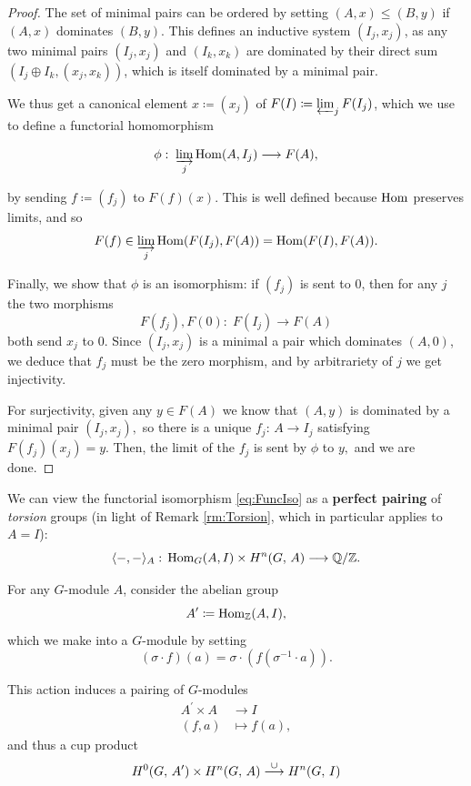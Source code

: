\documentclass[a4paper, oneside]{memoir}
\begin{document}
\begin{proof}
    The set of minimal pairs can be ordered by setting \((A,x)\leq (B,y)\) if \((A,x)\) dominates \((B,y)\). This defines an inductive system \((I_j,x_j)\), as any two minimal pairs \((I_j,x_j)\) and \((I_k,x_k)\) are dominated by their direct sum \(\left(I_j\oplus I_k,(x_j,x_k)\right)\), which is itself dominated by a minimal pair.

    We thus get a canonical element \(x\coloneqq (x_j)\) of \(F(I)\coloneqq \varprojlim_j F(I_j)\), which we use to define a functorial homomorphism

    \[
        \phi: \; \varinjlim_j \operatorname{Hom}(A,I_j)\longrightarrow F(A),
    \]

    by sending \(f\coloneqq (f_j)\) to \(F(f)(x)\). This is well defined because \(\operatorname{Hom}\) preserves limits, and so
    \[
        F(f)\in\varinjlim_j{\operatorname{Hom}(F(I_j),F(A))}=\operatorname{Hom}(F(I),F(A)).
    \]

    Finally, we show that \(\phi\) is an isomorphism: if \((f_j)\) is sent to \(0\), then for any \(j\) the two morphisms
    \[
        F(f_j), F(0):\; F(I_j) \to F(A)
    \]
    both send \(x_j\) to \(0.\) Since \((I_j,x_j)\) is a minimal a pair which dominates \((A,0)\), we deduce that \(f_j\) must be the zero morphism, and by arbitrariety of \(j\) we get injectivity.

    For surjectivity, given any \(y\in F(A)\) we know that \((A,y)\) is dominated by a minimal pair \((I_j,x_j),\) so there is a unique \(f_j:\, A\to I_j\) satisfying \(F(f_j)(x_j)=y.\) Then, the limit of the \(f_j\) is sent by \(\phi\) to \(y,\) and we are done.
\end{proof}


\begin{remark}
    We can view the functorial isomorphism \eqref{eq:FuncIso} as a \textbf{perfect pairing} of \textit{torsion} groups (in light of Remark \ref{rm:Torsion}, which in particular applies to $A=I$):
    \[
        \langle-,-\rangle_A:\,\operatorname{Hom}_G(A,I)\times H^{n}( G, \, A )\longrightarrow\mathbb{Q} /\mathbb{Z}.
    \]
\end{remark}

For any \(G\)-module \(A\), consider the abelian group
\[
    A^{\prime}\coloneqq \operatorname{Hom}_{\mathbb{Z}}(A,I),
\]
which we make into a \(G\)-module by setting
\begin{equation}\label{eq:TateTwist}
    (\sigma\cdot f)(a)=\sigma\cdot(f(\sigma^{-1}\cdot a)).
\end{equation}

This action induces a pairing of \(G\)-modules
\begin{align*}
    A^\prime\times A & \to I         \\
    (f,a)            & \mapsto f(a),
\end{align*}
and thus a cup product
\[
    H^{0}( G, \, A^\prime )\times H^{n}( G, \, A )\overset{\cup}{\longrightarrow}H^{n}( G, \, I )
\]
\end{document}
